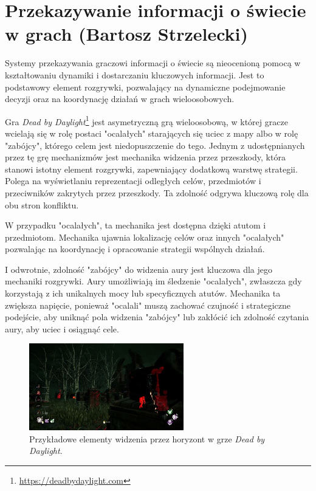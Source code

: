 \section{Przekazywanie informacji o świecie w grach (Bartosz Strzelecki)}\label{chap:dbd}
Systemy przekazywania graczowi informacji o świecie są nieocenioną pomocą w kształtowaniu dynamiki i dostarczaniu kluczowych informacji.
Jest to podstawowy element rozgrywki, pozwalający na dynamiczne podejmowanie decyzji oraz na koordynację działań w grach wieloosobowych.

Gra \textit{Dead by Daylight}\footnote{\url{https://deadbydaylight.com}} jest asymetryczną grą wieloosobową, w której gracze wcielają się w rolę postaci "ocalałych" starających się uciec
z mapy albo w rolę "zabójcy", którego celem jest niedopuszczenie do tego. Jednym z udostępnianych przez tę grę mechanizmów jest mechanika widzenia przez przeszkody, która stanowi istotny element rozgrywki, zapewniający
dodatkową warstwę strategii. Polega na wyświetlaniu reprezentacji odległych celów, przedmiotów i przeciwników
zakrytych przez przeszkody. Ta zdolność odgrywa kluczową rolę dla obu stron konfliktu.

W przypadku "ocalałych", ta mechanika jest dostępna dzięki atutom i przedmiotom. Mechanika ujawnia lokalizację celów oraz
innych "ocalałych" pozwalając na koordynację i opracowanie strategii wspólnych działań.

I odwrotnie, zdolność "zabójcy" do widzenia aury jest kluczowa dla jego mechaniki rozgrywki.
Aury umożliwiają im śledzenie "ocalałych", zwłaszcza gdy korzystają z ich unikalnych mocy lub specyficznych atutów.
Mechanika ta zwiększa napięcie, ponieważ "ocalali" muszą zachować czujność i strategiczne podejście,
aby uniknąć pola widzenia "zabójcy" lub zakłócić ich zdolność czytania aury, aby uciec i osiągnąć cele.

\begin{figure}[h]
\centering
\includegraphics[width=0.6\textwidth]{images/aura}
\caption{Przykładowe elementy widzenia przez horyzont w grze \textit{Dead by Daylight}.}
\end{figure}

